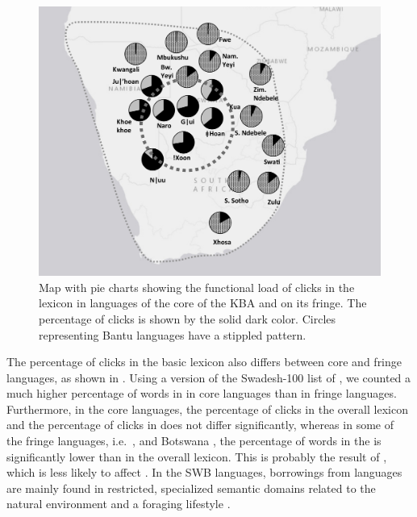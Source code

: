 \documentclass[output=paper
,newtxmath
,modfonts
,nonflat]{langsci/langscibook}
\begin{document}
\begin{figure}
\includegraphics[width=\textwidth]{figures/sands-fig2.png}
\caption{Map with pie charts showing the functional load of clicks in the lexicon in languages of the core of the KBA and on its fringe. The percentage of clicks is shown by the solid dark color. Circles representing Bantu languages have a stippled pattern.}
\label{fig:sands:2}
\end{figure}

The percentage of clicks in the basic lexicon also differs between core and fringe languages, as shown in . Using a version of the Swadesh-100 list of  \citep{Holman2008}, we counted a much higher percentage of  words in  in core languages than in fringe languages. Furthermore, in the core languages, the percentage of clicks in the overall lexicon and the percentage of clicks in  does not differ significantly, whereas in some of the fringe languages, i.e.\ ,  and Botswana , the percentage of  words in the  is significantly lower than in the overall lexicon. This is probably the result of , which is less likely to affect . In the SWB languages, borrowings from  languages are mainly found in restricted, specialized semantic domains related to the natural environment and a foraging lifestyle \citep{Gunnink2015}. 
\end{document}

